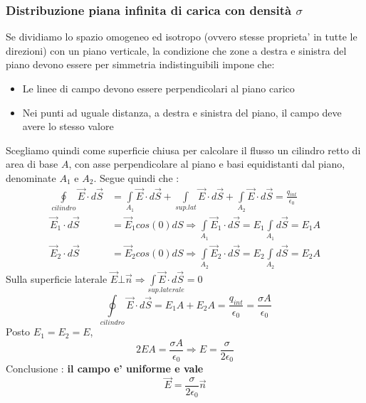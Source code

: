 \documentclass[a4paper, 10pt]{article}
\begin{document}
			\subsubsection{Distribuzione piana infinita di carica con densità $\sigma$}
				Se dividiamo lo spazio omogeneo ed isotropo (ovvero stesse proprieta' in tutte le direzioni) con un piano
				verticale, la condizione che zone a destra e sinistra del piano devono essere per simmetria indistinguibili 
				impone che:
				\begin{itemize}
					\item Le linee di campo devono essere perpendicolari al piano carico
					\item Nei punti ad uguale distanza, a destra e sinistra del piano, il campo deve avere lo stesso valore
				\end{itemize}
				Scegliamo quindi come superficie chiusa per calcolare il flusso un cilindro retto di area di base $A$, con asse
				perpendicolare al piano e basi equidistanti dal piano, denominate $A_1$ e $A_2$.
				Segue quindi che :
				\begin{equation*} \begin{split}
					\underset{cilindro}{\oint} \overrightarrow{E} \cdot d\overrightarrow{S} &= 
					\underset{A_1}{\int} \overrightarrow{E} \cdot d\overrightarrow{S} + \underset{sup.lat}{\int} 
					\overrightarrow{E} \cdot 
					d\overrightarrow{S} + \underset{A_2}{\int} \overrightarrow{E} \cdot d\overrightarrow{S} = 
					\frac{q_{int}}{\epsilon_0} \\
					\overrightarrow{E}_1 \cdot d\overrightarrow{S} &= \overrightarrow{E}_1 cos(0)dS \Rightarrow 
					\underset{A_1}{\int}\overrightarrow{E}_1 \cdot d\overrightarrow{S} = E_1 \underset{A_1}{\int}
					 d\overrightarrow{S} = E_1 A \\
					\overrightarrow{E}_2 \cdot d\overrightarrow{S} &= \overrightarrow{E}_2 cos(0)dS \Rightarrow 
					\underset{A_2}{\int}\overrightarrow{E}_2 \cdot d\overrightarrow{S} = E_2 \underset{A_2}{\int} 
					d\overrightarrow{S} = E_2 A 
				\end{split} \end{equation*} 
				Sulla superficie laterale 
				$\overrightarrow{E} \bot \overrightarrow{n} \Rightarrow \underset{sup.laterale}{\int \overrightarrow{E} \cdot 
				d\overrightarrow{S}} = 0$
				\[ \underset{cilindro}{\oint} \overrightarrow{E} \cdot d\overrightarrow{S} 
				= E_1 A + E_2 A = \frac{q_{int}}{\epsilon_0} = \frac{\sigma A}{\epsilon_0}\]
				Posto $E_1 = E_2 = E$,
				\[ 2EA = \frac{\sigma A}{\epsilon_0} \Rightarrow E = \frac{\sigma}{2\epsilon_0}\]
				Conclusione : \textbf{il campo e' uniforme e vale} \[\overrightarrow{E} = 
				\frac{\sigma}{2\epsilon_0}	\overrightarrow{n}\]
\end{document}
